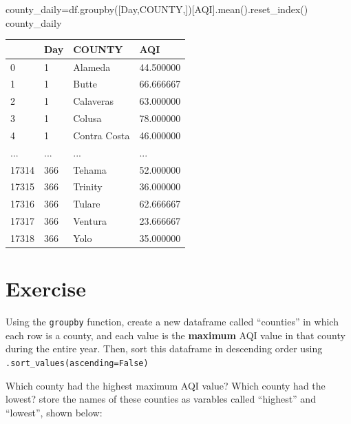 \documentclass[
  letterpaper,
  DIV=11,
  numbers=noendperiod]{scrreprt}
\newenvironment{Shaded}{\begin{snugshade}}{\end{snugshade}}
\newcommand{\NormalTok}[1]{\textcolor[rgb]{0.00,0.23,0.31}{#1}}
\newcommand{\OperatorTok}[1]{\textcolor[rgb]{0.37,0.37,0.37}{#1}}
\newcommand{\StringTok}[1]{\textcolor[rgb]{0.13,0.47,0.30}{#1}}
\begin{document}
\begin{Shaded}
\begin{Highlighting}[]
\NormalTok{county\_daily}\OperatorTok{=}\NormalTok{df.groupby([}\StringTok{\textquotesingle{}Day\textquotesingle{}}\NormalTok{,}\StringTok{\textquotesingle{}COUNTY\textquotesingle{}}\NormalTok{,])[}\StringTok{\textquotesingle{}AQI\textquotesingle{}}\NormalTok{].mean().reset\_index()}
\NormalTok{county\_daily}
\end{Highlighting}
\end{Shaded}

\begin{longtable}[]{@{}llll@{}}
\toprule()
& Day & COUNTY & AQI \\
\midrule()
\endhead
0 & 1 & Alameda & 44.500000 \\
1 & 1 & Butte & 66.666667 \\
2 & 1 & Calaveras & 63.000000 \\
3 & 1 & Colusa & 78.000000 \\
4 & 1 & Contra Costa & 46.000000 \\
... & ... & ... & ... \\
17314 & 366 & Tehama & 52.000000 \\
17315 & 366 & Trinity & 36.000000 \\
17316 & 366 & Tulare & 62.666667 \\
17317 & 366 & Ventura & 23.666667 \\
17318 & 366 & Yolo & 35.000000 \\
\bottomrule()
\end{longtable}

\hypertarget{exercise-6}{%
\section{Exercise}\label{exercise-6}}

Using the \texttt{groupby} function, create a new dataframe called
``counties'' in which each row is a county, and each value is the
\textbf{maximum} AQI value in that county during the entire year. Then,
sort this dataframe in descending order using
\texttt{.sort\_values(ascending=False)}

Which county had the highest maximum AQI value? Which county had the
lowest? store the names of these counties as varables called ``highest''
and ``lowest'', shown below:
\end{document}
